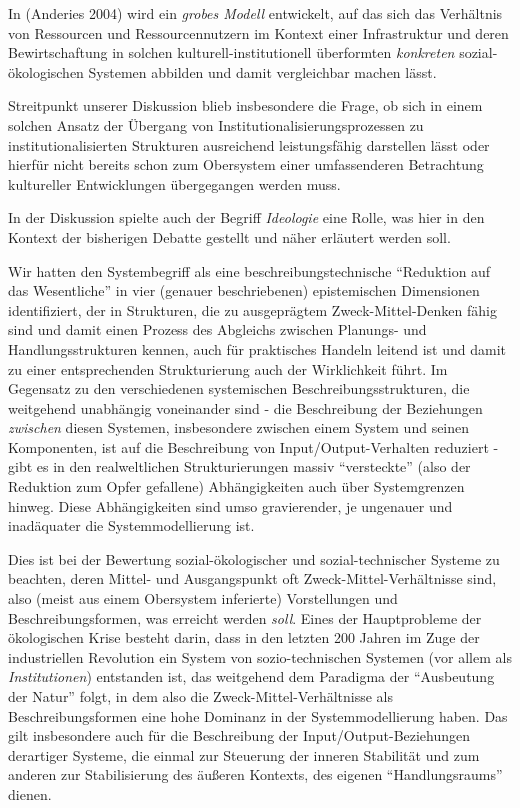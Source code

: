 \documentclass[11pt,a4paper]{article}
\begin{document}
In (Anderies 2004) wird ein \emph{grobes Modell} entwickelt, auf das
sich das Verhältnis von Ressourcen und Ressourcennutzern im Kontext
einer Infrastruktur und deren Bewirtschaftung in solchen
kulturell-institutionell überformten \emph{konkreten}
sozial-ökologischen Systemen abbilden und damit vergleichbar machen
lässt.

Streitpunkt unserer Diskussion blieb insbesondere die Frage, ob sich in
einem solchen Ansatz der Übergang von Institutionalisierungsprozessen zu
institutionalisierten Strukturen ausreichend leistungsfähig darstellen
lässt oder hierfür nicht bereits schon zum Obersystem einer
umfassenderen Betrachtung kultureller Entwicklungen übergegangen werden
muss.

In der Diskussion spielte auch der Begriff \emph{Ideologie} eine Rolle,
was hier in den Kontext der bisherigen Debatte gestellt und näher
erläutert werden soll.

Wir hatten den Systembegriff als eine beschreibungstechnische
``Reduktion auf das Wesentliche'' in vier (genauer beschriebenen)
epistemischen Dimensionen identifiziert, der in Strukturen, die zu
ausgeprägtem Zweck-Mittel-Denken fähig sind und damit einen Prozess des
Abgleichs zwischen Planungs- und Handlungsstrukturen kennen, auch für
praktisches Handeln leitend ist und damit zu einer entsprechenden
Strukturierung auch der Wirklichkeit führt. Im Gegensatz zu den
verschiedenen systemischen Beschreibungsstrukturen, die weitgehend
unabhängig voneinander sind - die Beschreibung der Beziehungen
\emph{zwischen} diesen Systemen, insbesondere zwischen einem System und
seinen Komponenten, ist auf die Beschreibung von Input/Output-Verhalten
reduziert - gibt es in den realweltlichen Strukturierungen massiv
``versteckte'' (also der Reduktion zum Opfer gefallene) Abhängigkeiten
auch über Systemgrenzen hinweg. Diese Abhängigkeiten sind umso
gravierender, je ungenauer und inadäquater die Systemmodellierung ist.

Dies ist bei der Bewertung sozial-ökologischer und sozial-technischer
Systeme zu beachten, deren Mittel- und Ausgangspunkt oft
Zweck-Mittel-Verhältnisse sind, also (meist aus einem Obersystem
inferierte) Vorstellungen und Beschreibungsformen, was erreicht werden
\emph{soll}. Eines der Hauptprobleme der ökologischen Krise besteht
darin, dass in den letzten 200 Jahren im Zuge der industriellen
Revolution ein System von sozio-technischen Systemen (vor allem als
\emph{Institutionen}) entstanden ist, das weitgehend dem Paradigma der
``Ausbeutung der Natur'' folgt, in dem also die
Zweck-Mittel-Verhältnisse als Beschreibungsformen eine hohe Dominanz in
der Systemmodellierung haben. Das gilt insbesondere auch für die
Beschreibung der Input/Output-Beziehungen derartiger Systeme, die einmal
zur Steuerung der inneren Stabilität und zum anderen zur Stabilisierung
des äußeren Kontexts, des eigenen ``Handlungsraums'' dienen.
\end{document}
